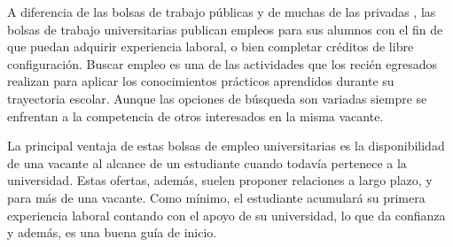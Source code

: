 A diferencia de las bolsas de trabajo públicas y de muchas de las privadas , las bolsas de trabajo universitarias publican empleos para sus alumnos con el fin de que puedan adquirir experiencia laboral, o bien completar créditos de libre configuración. Buscar empleo es una de las actividades que los recién egresados realizan para aplicar los conocimientos prácticos aprendidos durante su trayectoria escolar. Aunque las opciones de búsqueda son variadas siempre se enfrentan a la competencia de otros 
interesados en la misma vacante. \cite{UniJob}\\

\newline



La principal ventaja de estas bolsas de empleo universitarias es la disponibilidad de una vacante al alcance de un estudiante cuando todavía 
pertenece a la universidad. Estas ofertas, además, suelen proponer relaciones a largo plazo, y para más de una vacante. 
Como mínimo, el estudiante acumulará su primera experiencia laboral contando con el apoyo de su universidad, lo que da confianza y además, es una buena guía de inicio.

 
    